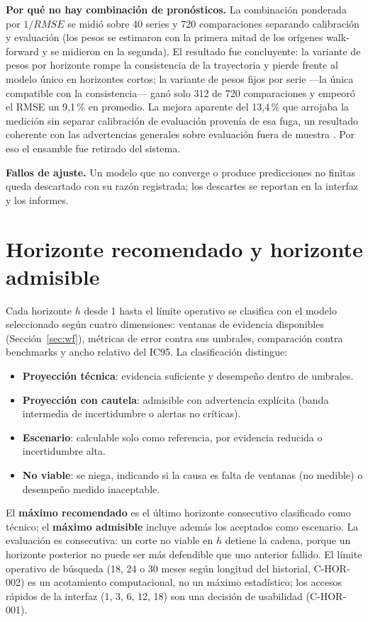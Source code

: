 \documentclass[12pt]{article}
\begin{document}
\textbf{Por qu\'e no hay combinaci\'on de pron\'osticos.} La combinaci\'on ponderada por $1/RMSE$ se midi\'o sobre 40 series y 720 comparaciones separando calibraci\'on y evaluaci\'on (los pesos se estimaron con la primera mitad de los or\'igenes walk-forward y se midieron en la segunda). El resultado fue concluyente: la variante de pesos por horizonte rompe la consistencia de la trayectoria y pierde frente al modelo \'unico en horizontes cortos; la variante de pesos fijos por serie ---la \'unica compatible con la consistencia--- gan\'o solo 312 de 720 comparaciones y empeor\'o el RMSE un 9{,}1\,\% en promedio. La mejora aparente del 13{,}4\,\% que arrojaba la medici\'on sin separar calibraci\'on de evaluaci\'on proven\'ia de esa fuga, un resultado coherente con las advertencias generales sobre evaluaci\'on fuera de muestra \citep{tashman2000}. Por eso el ensamble fue retirado del sistema.

\textbf{Fallos de ajuste.} Un modelo que no converge o produce predicciones no finitas queda descartado con su raz\'on registrada; los descartes se reportan en la interfaz y los informes.

\section{Horizonte recomendado y horizonte admisible}
\label{sec:horizonte}

Cada horizonte $h$ desde 1 hasta el l\'imite operativo se clasifica con el modelo seleccionado seg\'un cuatro dimensiones: ventanas de evidencia disponibles (Secci\'on~\ref{sec:wf}), m\'etricas de error contra sus umbrales, comparaci\'on contra benchmarks y ancho relativo del IC95. La clasificaci\'on distingue:

\begin{itemize}
  \item \textbf{Proyecci\'on t\'ecnica}: evidencia suficiente y desempe\~no dentro de umbrales.
  \item \textbf{Proyecci\'on con cautela}: admisible con advertencia expl\'icita (banda intermedia de incertidumbre o alertas no cr\'iticas).
  \item \textbf{Escenario}: calculable solo como referencia, por evidencia reducida o incertidumbre alta.
  \item \textbf{No viable}: se niega, indicando si la causa es falta de ventanas (no medible) o desempe\~no medido inaceptable.
\end{itemize}

El \textbf{m\'aximo recomendado} es el \'ultimo horizonte consecutivo clasificado como t\'ecnico; el \textbf{m\'aximo admisible} incluye adem\'as los aceptados como escenario. La evaluaci\'on es consecutiva: un corte no viable en $h$ detiene la cadena, porque un horizonte posterior no puede ser m\'as defendible que uno anterior fallido. El l\'imite operativo de b\'usqueda (18, 24 o 30 meses seg\'un longitud del historial, C-HOR-002) es un acotamiento computacional, no un m\'aximo estad\'istico; los accesos r\'apidos de la interfaz (1, 3, 6, 12, 18) son una decisi\'on de usabilidad (C-HOR-001).
\end{document}
